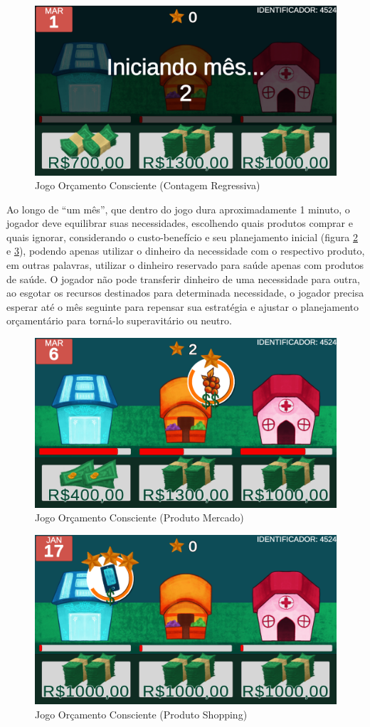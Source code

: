 \graphicspath{{figuras/}}
\begin{figure}[!ht]
\centering
\begin{minipage}{1.\linewidth}
\center
\caption{Jogo Orçamento Consciente (Contagem Regressiva)} \label{fig: figura02-contagem}
\includegraphics[width=0.4\linewidth]{02-figura_contagem-regressiva-mes.png}
\end{minipage}
\end{figure}

\newpage
Ao longo de “um mês”, que dentro do jogo dura aproximadamente 1 minuto, o jogador deve equilibrar suas necessidades, escolhendo quais produtos comprar e quais ignorar, considerando o custo-benefício e seu planejamento inicial (figura \ref{fig: figura03-mercado} e \ref{fig: figura04-shopping}), podendo apenas utilizar o dinheiro da necessidade com o respectivo produto, em outras palavras, utilizar o dinheiro reservado para saúde apenas com produtos de saúde. O jogador não pode transferir dinheiro de uma necessidade para outra, ao esgotar os recursos destinados para determinada necessidade, o jogador precisa esperar até o mês seguinte para repensar sua estratégia e ajustar o planejamento orçamentário para torná-lo superavitário ou neutro.

\graphicspath{{figuras/}}
\begin{figure}[!ht]
\centering
\begin{minipage}{1\linewidth}
\centering
\caption{Jogo Orçamento Consciente (Produto Mercado)} \label{fig: figura03-mercado}
\includegraphics[width=0.4\linewidth]{03-figura_tela-jogo-mercado.png}
\end{minipage}
\end{figure}

\graphicspath{{figuras/}}
\begin{figure}[!ht]
\centering
\begin{minipage}{1\linewidth}
\centering
\caption{Jogo Orçamento Consciente (Produto Shopping)} \label{fig: figura04-shopping}
\includegraphics[width=0.4\linewidth]{04-figura_tela-jogo-shopping.png}
\end{minipage}
\end{figure}

